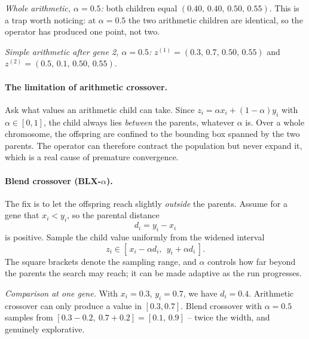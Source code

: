 \documentclass[11pt,a4paper]{article}
\begin{document}
\emph{Whole arithmetic, $\alpha=0.5$:} both children equal
$(0.40,\,0.40,\,0.50,\,0.55)$. This is a trap worth noticing:
at $\alpha=0.5$ the two arithmetic children are identical, so the operator
has produced one point, not two.

\emph{Simple arithmetic after gene 2, $\alpha=0.5$:}
$z^{(1)}=(0.3,\,0.7,\,0.50,\,0.55)$ and $z^{(2)}=(0.5,\,0.1,\,0.50,\,0.55)$.

\paragraph{The limitation of arithmetic crossover.}
Ask what values an arithmetic child can take. Since
$z_i=\alpha x_i+(1-\alpha)y_i$ with $\alpha\in[0,1]$, the child always lies
\emph{between} the parents, whatever $\alpha$ is. Over a whole chromosome, the
offspring are confined to the bounding box spanned by the two parents. The
operator can therefore contract the population but never expand it, which is
a real cause of premature convergence.

\paragraph{Blend crossover (BLX-$\alpha$).}
The fix is to let the offspring reach slightly \emph{outside} the parents.
Assume for a gene that $x_i<y_i$, so the parental distance
\[
  d_i=y_i-x_i
\]
is positive. Sample the child value uniformly from the widened interval
\[
  z_i\in\left[\,x_i-\alpha d_i,\ \ y_i+\alpha d_i\,\right].
\]
The square brackets denote the sampling range, and $\alpha$ controls how far
beyond the parents the search may reach; it can be made adaptive as the run
progresses.

\emph{Comparison at one gene.} With $x_i=0.3$, $y_i=0.7$, we have $d_i=0.4$.
Arithmetic crossover can only produce a value in $[0.3,0.7]$. Blend crossover
with $\alpha=0.5$ samples from $[0.3-0.2,\ 0.7+0.2]=[0.1,\,0.9]$ -- twice the
width, and genuinely explorative.
\end{document}
